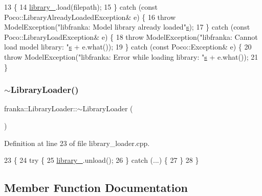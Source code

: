 \begin{DoxyCode}
13                                                           \{
14   \hyperlink{classfranka_1_1LibraryLoader_aa60d8a00447a53d4c754c9959adf39e1}{library\_}.load(filepath);
15 \} \textcolor{keywordflow}{catch} (\textcolor{keyword}{const} Poco::LibraryAlreadyLoadedException& e) \{
16   \textcolor{keywordflow}{throw} ModelException(\textcolor{stringliteral}{"libfranka: Model library already loaded"}\hyperlink{namespaceservice__node__3_aa976421a49e0b54f23833423400849ae}{s});
17 \} \textcolor{keywordflow}{catch} (\textcolor{keyword}{const} Poco::LibraryLoadException& e) \{
18   \textcolor{keywordflow}{throw} ModelException(\textcolor{stringliteral}{"libfranka: Cannot load model library: "}\hyperlink{namespaceservice__node__3_aa976421a49e0b54f23833423400849ae}{s} + e.what());
19 \} \textcolor{keywordflow}{catch} (\textcolor{keyword}{const} Poco::Exception& e) \{
20   \textcolor{keywordflow}{throw} ModelException(\textcolor{stringliteral}{"libfranka: Error while loading library: "}\hyperlink{namespaceservice__node__3_aa976421a49e0b54f23833423400849ae}{s} + e.what());
21 \}
\end{DoxyCode}
\mbox{\label{classfranka_1_1LibraryLoader_afe13947a39603d6ba07a4c93bd5d7650}} 
\subsubsection{\texorpdfstring{$\sim$\+Library\+Loader()}{~LibraryLoader()}}
{\footnotesize\ttfamily franka\+::\+Library\+Loader\+::$\sim$\+Library\+Loader (\begin{DoxyParamCaption}{ }\end{DoxyParamCaption})}



Definition at line 23 of file library\+\_\+loader.\+cpp.


\begin{DoxyCode}
23                               \{
24   \textcolor{keywordflow}{try} \{
25     \hyperlink{classfranka_1_1LibraryLoader_aa60d8a00447a53d4c754c9959adf39e1}{library\_}.unload();
26   \} \textcolor{keywordflow}{catch} (...) \{
27   \}
28 \}
\end{DoxyCode}


\subsection{Member Function Documentation}
\mbox{\label{classfranka_1_1LibraryLoader_aa1ca9b340a61553992e9bc43d04c5376}} 

